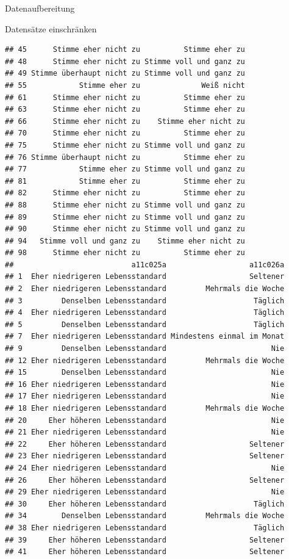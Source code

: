 \documentclass[ignorenonframetext,]{beamer}
\begin{document}
\begin{frame}[fragile]{Datenaufbereitung}
\begin{block}{Datensätze einschränken}
\begin{verbatim}
## 45      Stimme eher nicht zu          Stimme eher zu
## 48      Stimme eher nicht zu Stimme voll und ganz zu
## 49 Stimme überhaupt nicht zu Stimme voll und ganz zu
## 55            Stimme eher zu              Weiß nicht
## 61      Stimme eher nicht zu          Stimme eher zu
## 63      Stimme eher nicht zu          Stimme eher zu
## 66      Stimme eher nicht zu    Stimme eher nicht zu
## 70      Stimme eher nicht zu          Stimme eher zu
## 75      Stimme eher nicht zu Stimme voll und ganz zu
## 76 Stimme überhaupt nicht zu          Stimme eher zu
## 77            Stimme eher zu Stimme voll und ganz zu
## 81            Stimme eher zu          Stimme eher zu
## 82      Stimme eher nicht zu          Stimme eher zu
## 88      Stimme eher nicht zu Stimme voll und ganz zu
## 89      Stimme eher nicht zu Stimme voll und ganz zu
## 90      Stimme eher nicht zu Stimme voll und ganz zu
## 94   Stimme voll und ganz zu    Stimme eher nicht zu
## 98      Stimme eher nicht zu          Stimme eher zu
##                           a11c025a                   a11c026a
## 1  Eher niedrigeren Lebensstandard                   Seltener
## 2  Eher niedrigeren Lebensstandard         Mehrmals die Woche
## 3         Denselben Lebensstandard                    Täglich
## 4  Eher niedrigeren Lebensstandard                    Täglich
## 5         Denselben Lebensstandard                    Täglich
## 7  Eher niedrigeren Lebensstandard Mindestens einmal im Monat
## 9         Denselben Lebensstandard                        Nie
## 12 Eher niedrigeren Lebensstandard         Mehrmals die Woche
## 15        Denselben Lebensstandard                        Nie
## 16 Eher niedrigeren Lebensstandard                        Nie
## 17 Eher niedrigeren Lebensstandard                        Nie
## 18 Eher niedrigeren Lebensstandard         Mehrmals die Woche
## 20     Eher höheren Lebensstandard                        Nie
## 21 Eher niedrigeren Lebensstandard                        Nie
## 22     Eher höheren Lebensstandard                   Seltener
## 23 Eher niedrigeren Lebensstandard                   Seltener
## 24 Eher niedrigeren Lebensstandard                        Nie
## 26     Eher höheren Lebensstandard                   Seltener
## 29 Eher niedrigeren Lebensstandard                        Nie
## 30     Eher höheren Lebensstandard                    Täglich
## 34        Denselben Lebensstandard         Mehrmals die Woche
## 38 Eher niedrigeren Lebensstandard                    Täglich
## 39     Eher höheren Lebensstandard                   Seltener
## 41     Eher höheren Lebensstandard                   Seltener

\end{verbatim}
\end{block}
\end{frame}
\end{document}
